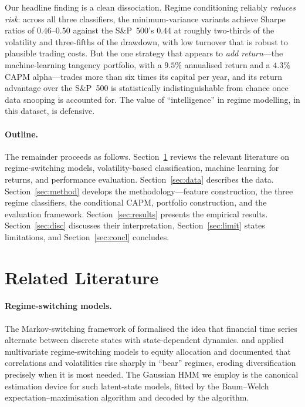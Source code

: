\documentclass[12pt,a4paper]{article}
\begin{document}
Our headline finding is a clean dissociation. Regime conditioning reliably \emph{reduces
risk}: across all three classifiers, the minimum-variance variants achieve Sharpe ratios
of $0.46$--$0.50$ against the S\&P~500's $0.44$ at roughly two-thirds of the volatility
and three-fifths of the drawdown, with low turnover that is robust to plausible trading
costs. But the one strategy that appears to \emph{add return}---the machine-learning
tangency portfolio, with a $9.5\%$ annualised return and a $4.3\%$ CAPM alpha---trades
more than six times its capital per year, and its return advantage over the S\&P~500 is
statistically indistinguishable from chance once data snooping is accounted for. The
value of ``intelligence'' in regime modelling, in this dataset, is defensive.

\paragraph{Outline.}
The remainder proceeds as follows. Section~\ref{sec:lit} reviews the relevant literature
on regime-switching models, volatility-based classification, machine learning for
returns, and performance evaluation. Section~\ref{sec:data} describes the data.
Section~\ref{sec:method} develops the methodology---feature construction, the three
regime classifiers, the conditional CAPM, portfolio construction, and the evaluation
framework. Section~\ref{sec:results} presents the empirical results. Section~\ref{sec:disc}
discusses their interpretation, Section~\ref{sec:limit} states limitations, and
Section~\ref{sec:concl} concludes.

\section{Related Literature}\label{sec:lit}
\paragraph{Regime-switching models.}
The Markov-switching framework of \citet{hamilton1989} formalised the idea that financial
time series alternate between discrete states with state-dependent dynamics.
\citet{ang2002} and \citet{guidolin2007} applied multivariate regime-switching models to
equity allocation and documented that correlations and volatilities rise sharply in
``bear'' regimes, eroding diversification precisely when it is most needed. The Gaussian
HMM we employ is the canonical estimation device for such latent-state models, fitted by
the Baum--Welch expectation--maximisation algorithm \citep{baum1970, dempster1977} and
decoded by the \citet{viterbi1967} algorithm.
\end{document}
